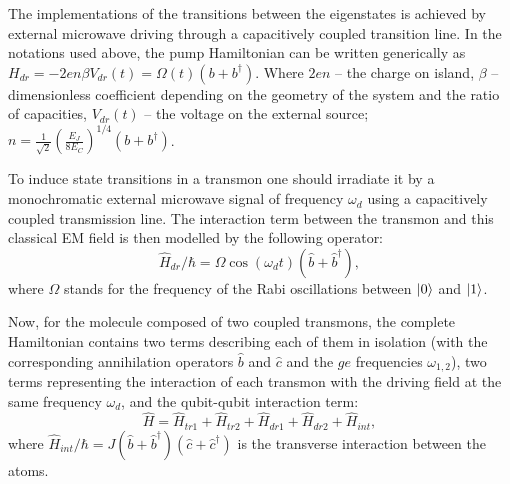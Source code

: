 \documentclass[%
 aip,
 amsmath,amssymb,
 reprint,%
]{revtex4-1}
\begin{document}
The implementations of the transitions between the eigenstates is achieved by external microwave driving through a capacitively coupled transition line. In the notations used above, the pump Hamiltonian can be written generically as $ 	H_{dr} = -2e n\beta V_{dr}(t)=\Omega(t)(b+b^{\dagger})$.
Where $2en$ -- the charge on island, $\beta$ -- dimensionless coefficient depending on the geometry of the system and the ratio of capacities, $V_{dr}(t)$ -- the voltage on the external source; $n =\frac{1}{\sqrt{2}} (\frac{E_J}{8E_C})^{1/4}(b+b^{\dagger})$.

To induce state transitions in a transmon one should irradiate it by a monochromatic external microwave signal of frequency $\omega_d$ using a capacitively coupled transmission line. The interaction term between the transmon and this classical EM field is then modelled by the following operator: 
\begin{equation}
\hat H_{dr}/\hbar = \Omega\cos(\omega_d t)(\hat b+\hat b^{\dagger}),
\end{equation}
where $\Omega$ stands for the frequency of the Rabi oscillations between $\ket{0}$ and $\ket{1}$.

Now, for the molecule composed of two coupled transmons, the complete Hamiltonian contains two terms describing each of them in isolation (with the corresponding annihilation operators $\hat b$ and $\hat c$ and the $ge$ frequencies $\omega_{1,2}$), two terms representing the interaction of each transmon with the driving field at the same frequency $\omega_d$, and the qubit-qubit interaction term:
\begin{equation}\label{Hsystem}
\hat H = \hat H_{tr1}+\hat H_{tr2}+\hat H_{dr1}+\hat H_{dr2}+\hat H_{int},
\end{equation}
where $\hat H_{int}/\hbar= J (\hat b +\hat b^\dag)(\hat c+\hat c^{\dagger})$ is the transverse interaction between the atoms.
\end{document}
